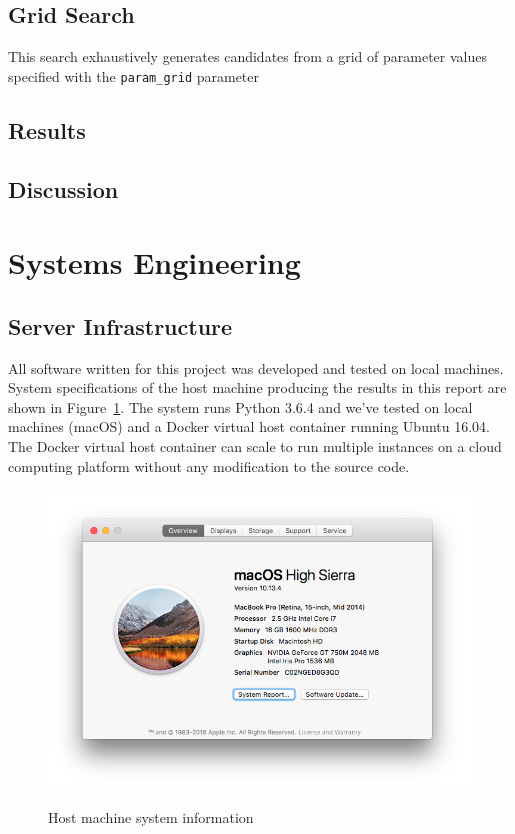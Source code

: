\documentclass[11pt, oneside]{article}
\begin{document}
\subsection{Grid Search}
This search exhaustively generates candidates from a grid of parameter values specified with the \texttt{param\_grid} parameter
\subsection{Results}
\subsection{Discussion}

\section{Systems Engineering}
\subsection{Server Infrastructure}
All software written for this project was developed and tested on local machines. System specifications of the host machine producing the results in this report are shown in Figure~\ref{fig:System_Specs}. The system runs Python 3.6.4 and we've tested on local machines (macOS) and a Docker virtual host container running Ubuntu 16.04. The Docker virtual host container can scale to run multiple instances on a cloud computing platform without any modification to the source code.

\begin{figure}[h]
  \caption{Host machine system information}
  \centering
  \includegraphics[width=12.5cm]{images/System_Specs.png}
  \label{fig:System_Specs}
\end{figure}
\end{document}
